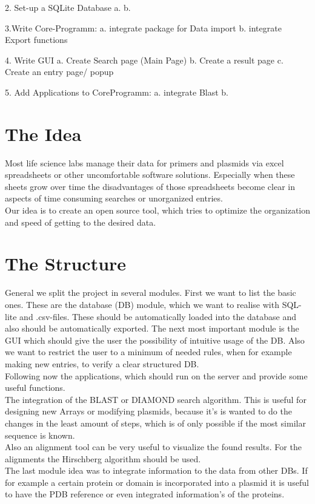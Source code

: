 \documentclass[]{article}
\begin{document}
2. Set-up a SQLite Database
	a.
	b.

3.Write Core-Programm:
	a. integrate package for Data import
	b. integrate Export functions

4. Write GUI
	a. Create Search page (Main Page)
	b. Create a result page
	c. Create an entry page/ popup
	
5. Add Applications to CoreProgramm:
	a. integrate Blast
	b. 
	

\section{ The Idea}
Most life science labs manage their data for primers and plasmids via excel spreadsheets or other uncomfortable software solutions. Especially when these sheets grow over time the disadvantages of those spreadsheets become clear in aspects of time consuming searches or unorganized entries. 
\\
Our idea is to create an open source tool, which tries to optimize the organization and speed of getting to the desired data.


\section{ The Structure}
General we split the project in several modules. First we want to list the basic ones. These are the database (DB) module, which we want to realise with SQL-lite and .csv-files. These should be automatically loaded into the database and also should be automatically exported.
The next most important module is the GUI which should give the user the possibility of intuitive usage of the DB. Also we want to restrict the user to a minimum of needed rules, when for example making new entries, to verify a clear structured DB.\\
Following now the applications, which should run on the server and provide some useful functions.\\
The integration of the BLAST or DIAMOND search algorithm. This is useful for designing new Arrays or modifying plasmids, because it's is wanted to do the changes in the least amount of steps, which is of only possible if the most similar sequence is known.\\
Also an alignment tool can be very useful to visualize the found results. For the alignments the Hirschberg algorithm should be used.\\
The last module idea was to integrate information to the data from other DBs. If for example a certain protein or domain is incorporated into a plasmid it is useful to have the PDB reference or even integrated information’s of the proteins.
\end{document}
